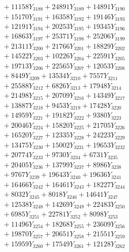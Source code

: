 \documentclass[a4paper,10pt]{article}
\begin{document}
{\begin{align}
&\;  + 11158 Y_{3188} + 24891 Y_{3189} + 14891 Y_{3190} \\[0.3ex]
&\;  + 15170 Y_{3191} + 16358 Y_{3192} + 19146 Y_{3193} \\[0.3ex]
&\;  + 12191 Y_{3194} + 20253 Y_{3195} + 19345 Y_{3196} \\[0.3ex]
&\;  + 16863 Y_{3197} + 25371 Y_{3198} + 25206 Y_{3199} \\[0.3ex]
&\;  + 21311 Y_{3200} + 21766 Y_{3201} + 18829 Y_{3202} \\[0.3ex]
&\;  + 14522 Y_{3203} + 10226 Y_{3204} + 22591 Y_{3205} \\[0.3ex]
&\;  + 19713 Y_{3206} + 22565 Y_{3207} + 12053 Y_{3208} \\[0.5ex]\allowbreak
&\;  + 8449 Y_{3209} + 13534 Y_{3210} + 7557 Y_{3211} \\[0.3ex]
&\;  + 25588 Y_{3212} + 6826 Y_{3213} + 17948 Y_{3214} \\[0.3ex]
&\;  + 21498 Y_{3215} + 20709 Y_{3216} + 14349 Y_{3217} \\[0.3ex]
&\;  + 13887 Y_{3218} + 9453 Y_{3219} + 17428 Y_{3220} \\[0.3ex]
&\;  + 14959 Y_{3221} + 19182 Y_{3222} + 9380 Y_{3223} \\[0.3ex]
&\;  + 20046 Y_{3224} + 15820 Y_{3225} + 21705 Y_{3226} \\[0.3ex]
&\;  + 16520 Y_{3227} + 12335 Y_{3228} + 24223 Y_{3229} \\[0.3ex]
&\;  + 13475 Y_{3230} + 15002 Y_{3231} + 19653 Y_{3232} \\[0.3ex]
&\;  + 20774 Y_{3233} + 9730 Y_{3234} + 6731 Y_{3235} \\[0.3ex]
&\;  + 20405 Y_{3236} + 13799 Y_{3237} + 8986 Y_{3238} \\[0.5ex]\allowbreak
&\;  + 9767 Y_{3239} + 19643 Y_{3240} + 19636 Y_{3241} \\[0.3ex]
&\;  + 16466 Y_{3242} + 16461 Y_{3243} + 18227 Y_{3244} \\[0.3ex]
&\;  + 8032 Y_{3245} + 8018 Y_{3246} + 14641 Y_{3247} \\[0.3ex]
&\;  + 12538 Y_{3248} + 14269 Y_{3249} + 22483 Y_{3250} \\[0.3ex]
&\;  + 6985 Y_{3251} + 22781 Y_{3252} + 8098 Y_{3253} \\[0.3ex]
&\;  + 11496 Y_{3254} + 18268 Y_{3255} + 23609 Y_{3256} \\[0.3ex]
&\;  + 19870 Y_{3257} + 20651 Y_{3258} + 21551 Y_{3259} \\[0.3ex]
&\;  + 15959 Y_{3260} + 17549 Y_{3261} + 12128 Y_{3262} \\[0.3ex]

\end{align}}
\end{document}
